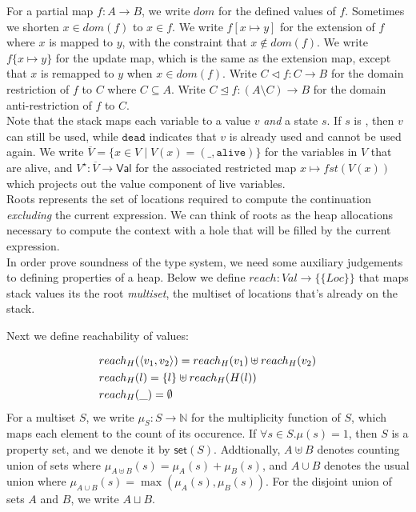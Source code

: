 \documentclass[11pt]{article}
\newcommand{\ms}[1]{\ensuremath{\mathsf{#1}}}
\newcommand{\irl}[1]{\mathtt{#1}}
\begin{document}
\noindent 
For a partial map $f : A \to B$, we write $dom$ for the defined values of $f$. Sometimes we shorten $x \in dom(f)$ to $x \in f$. We write $f[x \mapsto y]$ for the extension of $f$ where $x$ is mapped to $y$, with the constraint that $x \notin dom(f)$. We write $f\{x \mapsto y\}$ for the update map, which is the same as the extension map, except that $x$ is remapped to $y$ when $x \in dom(f)$. Write $C \lhd f : C \to B$ for the domain restriction of $f$ to $C$ where $C \subseteq A$. Write $C \unlhd f : (A \setminus C) \to B$ for the domain anti-restriction of $f$ to $C$.\\

\noindent
Note that the stack maps each variable to a value $v$ \emph{and} a state $s$. If $s$ is \irl{alive}, then $v$ can still be used, while $\irl{dead}$ indicates that $v$ is already used and cannot be used again. We write $\overline V = \{x \in V \mid V(x) = (\_,\irl{alive}) \}$ for the variables in $V$ that are alive, and $V^{\star} : \overline V \to \ms{Val}$ for the associated restricted map $x \mapsto fst(V(x))$ which projects out the value component of live variables.\\ 

\noindent
Roots represents the set of locations required to compute the continuation \emph{excluding} the current expression.
We can think of roots as the heap allocations necessary to compute the context with a hole that will be filled
by the current expression.\\

\noindent
In order prove soundness of the type system, we need some auxiliary judgements to defining properties of a heap. Below we define $reach : Val \to \{\{Loc\}\}$ that maps stack values its the root \emph{multiset}, the multiset of locations that's already on the stack. 

\noindent
Next we define reachability of values:

\begin{align*}
&reach_H(\langle v_1, v_2\rangle) = reach_H(v_1) \uplus reach_H(v_2)\\
&reach_H(l) = \{l\} \uplus reach_H(H(l))\\
&reach_H(\_) = \emptyset
\end{align*}
For a multiset $S$, we write $\mu_S : S \to \mathbb{N}$ for the multiplicity function of $S$, which maps each element to the count of its occurence. If $\forall s \in S. \mu(s) = 1$, then $S$ is a property set, and we denote it by $\ms{set}(S)$. Addtionally, $A \uplus B$ denotes counting union of sets where $\mu_{A \uplus B} (s) = \mu_A (s) + \mu_B (s)$, and $A \cup B$ denotes the usual union where $\mu_{A \cup B}(s) = \max{(\mu_A(s),\mu_B(s))}$. For the disjoint union of sets $A$ and $B$, we write $A \sqcup B$.\\
\end{document}
